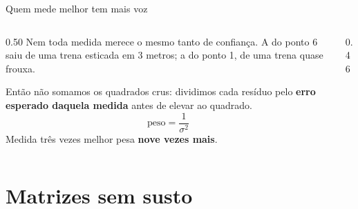 \documentclass[aspectratio=169,11pt]{beamer}
\newcommand{\bnum}[1]{\textbf{\textcolor{mTeal}{#1}}}
\begin{document}
\begin{frame}{Quem mede melhor tem mais voz}
  \begin{columns}[T]
    \begin{column}{0.50\textwidth}
      Nem toda medida merece o mesmo tanto de confiança. A do ponto 6 saiu de uma
      trena esticada em 3 metros; a do ponto 1, de uma trena quase frouxa.
      \medskip

      Então não somamos os quadrados crus: dividimos cada resíduo pelo
      \bnum{erro esperado daquela medida} antes de elevar ao quadrado.
      \[ \text{peso} = \frac{1}{\sigma^2} \]
      Medida três vezes melhor pesa \bnum{nove vezes mais}.
    \end{column}
    \begin{column}{0.46\textwidth}
      \centering
    \end{column}
  \end{columns}
\end{frame}

\section{Matrizes sem susto}
\end{document}
